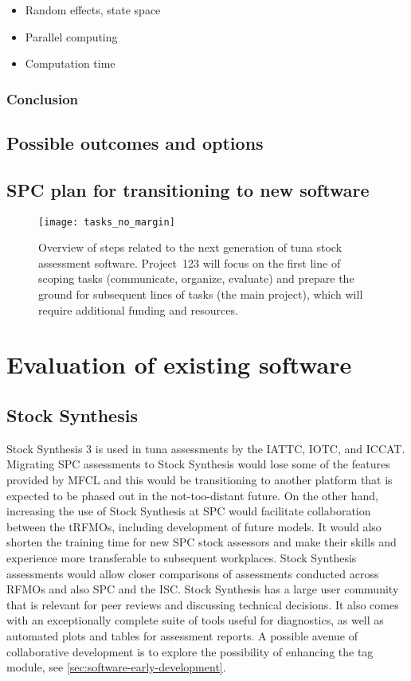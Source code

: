 \documentclass{SCreport}
\begin{document}
\begin{itemize}
  \item Random effects, state space
  \item Parallel computing
  \item Computation time
\end{itemize}

\subsubsection{Conclusion}

\subsection{Possible outcomes and options}

\subsection{SPC plan for transitioning to new software}

\begin{figure}[H]
  \centering
  \texttt{[image: tasks\_no\_margin]}
  \caption{Overview of steps related to the next generation of tuna stock
    assessment software. Project~123 will focus on the first line of scoping
    tasks (communicate, organize, evaluate) and prepare the ground for
    subsequent lines of tasks (the main project), which will require additional
    funding and resources.}\label{fig:diagram}
\end{figure}

\section{Evaluation of existing software}

\subsection{Stock Synthesis}

Stock Synthesis 3 is used in tuna assessments by the IATTC, IOTC, and ICCAT.
Migrating SPC assessments to Stock Synthesis would lose some of the features
provided by MFCL and this would be transitioning to another platform that is
expected to be phased out in the not-too-distant future. On the other hand,
increasing the use of Stock Synthesis at SPC would facilitate collaboration
between the tRFMOs, including development of future models. It would also
shorten the training time for new SPC stock assessors and make their skills and
experience more transferable to subsequent workplaces. Stock Synthesis
assessments would allow closer comparisons of assessments conducted across RFMOs
and also SPC and the ISC. Stock Synthesis has a large user community that is
relevant for peer reviews and discussing technical decisions. It also comes with
an exceptionally complete suite of tools useful for diagnostics, as well as
automated plots and tables for assessment reports. A possible avenue of
collaborative development is to explore the possibility of enhancing the tag
module, see \autoref{sec:software-early-development}.
\end{document}
